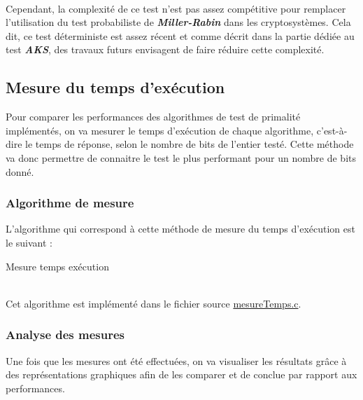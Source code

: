 			\paragraph{}Cependant, la complexité de ce test n'est pas assez compétitive pour remplacer l'utilisation du test probabiliste de \textit{\textbf{Miller-Rabin}} dans les cryptosystèmes. Cela dit, ce test déterministe est assez récent et comme décrit dans la partie dédiée au test \textit{\textbf{AKS}}, des travaux futurs envisagent de faire réduire cette complexité.
			
	\subsection{Mesure du temps d'exécution}
		Pour comparer les performances des algorithmes de test de primalité implémentés, on va mesurer le temps d'exécution de chaque algorithme, c'est-à-dire le temps de réponse, selon le nombre de bits de l'entier testé. Cette méthode va donc permettre de connaitre le test le plus performant pour un nombre de bits donné.
		
		\subsubsection*{Algorithme de mesure}
			L'algorithme qui correspond à cette méthode de mesure du temps d'exécution est le suivant :\\
			
			\begin{algorithm}[H]
				\caption{Mesure temps exécution}\label{MEST}
			\end{algorithm}
			~\\
			\noindent Cet algorithme est implémenté dans le fichier source \href{run:../../App/src/mesures_performance/mesureTemps.c}{mesureTemps.c}.
			
		\subsubsection*{Analyse des mesures}
			Une fois que les mesures ont été effectuées, on va visualiser les résultats grâce à des représentations graphiques afin de les comparer et de conclue par rapport aux performances.
